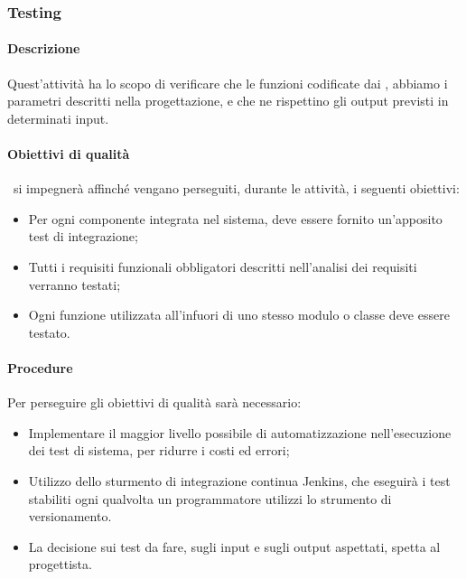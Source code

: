 \documentclass[../NormeDiProgetto_v3.0.0.tex]{subfiles}
\begin{document}
		\subsubsection{Testing}
		\paragraph{Descrizione}
			Quest'attività ha lo scopo di verificare che le funzioni codificate dai \programmatori, abbiamo i parametri descritti nella progettazione, e che ne rispettino gli output previsti in determinati input.

		\paragraph{Obiettivi di qualità}
			\kpanic\ si impegnerà affinché vengano perseguiti, durante le attività, i seguenti obiettivi:
			\begin{itemize}
				\item Per ogni componente integrata nel sistema, deve essere fornito un'apposito test di integrazione;
				\item Tutti i requisiti funzionali obbligatori descritti nell'analisi dei requisiti verranno testati;
				\item Ogni funzione utilizzata all'infuori di uno stesso modulo o classe deve essere testato.
			\end{itemize}
				
		\paragraph{Procedure}
			Per perseguire gli obiettivi di qualità sarà necessario:
			\begin{itemize}
				\item Implementare il maggior livello possibile di automatizzazione nell'esecuzione dei test di sistema, per ridurre i costi ed errori;
				\item Utilizzo dello sturmento di integrazione continua Jenkins, che eseguirà i test stabiliti ogni qualvolta un programmatore utilizzi lo strumento di versionamento.
				\item La decisione sui test da fare, sugli input e sugli output aspettati, spetta al progettista.
			\end{itemize}
\end{document}
